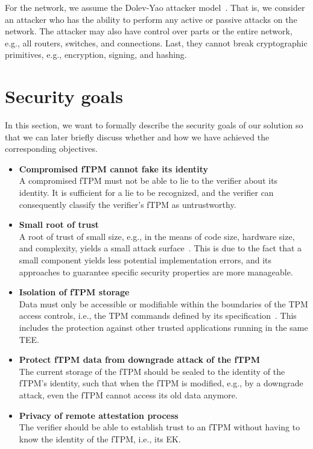For the network, we assume the Dolev-Yao attacker model~\cite{Dolev1983}.
That is, we consider an attacker who has the ability to perform any active or passive attacks on the network.
The attacker may also have control over parts or the entire network, e.g., all routers, switches, and connections.
Last, they cannot break cryptographic primitives, e.g., encryption, signing, and hashing.

\section{Security goals}

In this section, we want to formally describe the security goals of our solution so that we can later briefly discuss whether and how we have achieved the corresponding objectives.

\begin{itemize}
  \item{\textbf{Compromised fTPM cannot fake its identity}\\
  A compromised fTPM must not be able to lie to the verifier about its identity.
  It is sufficient for a lie to be recognized, and the verifier can consequently classify the verifier's fTPM as untrustworthy.}

  \item{\textbf{Small root of trust}\\
  A root of trust of small size, e.g., in the means of code size, hardware size, and complexity, yields a small attack surface~\cite{Singaravelu2006}.
  This is due to the fact that a small component yields less potential implementation errors, and its approaches to guarantee specific security properties are more manageable.}
  
  \item{\textbf{Isolation of fTPM storage}\\
  Data must only be accessible or modifiable within the boundaries of the TPM access controls, i.e., the TPM commands defined by its specification~\cite{tpm}.}
  This includes the protection against other trusted applications running in the same TEE\@.
  
  \item{\textbf{Protect fTPM data from downgrade attack of the fTPM}\\
  The current storage of the fTPM should be sealed to the identity of the fTPM's identity, such that when the fTPM is modified, e.g., by a downgrade attack, even the fTPM cannot access its old data anymore.}

  \item{\textbf{Privacy of remote attestation process}\\
  The verifier should be able to establish trust to an fTPM without having to know the identity of the fTPM, i.e., its EK\@.}
\end{itemize}

